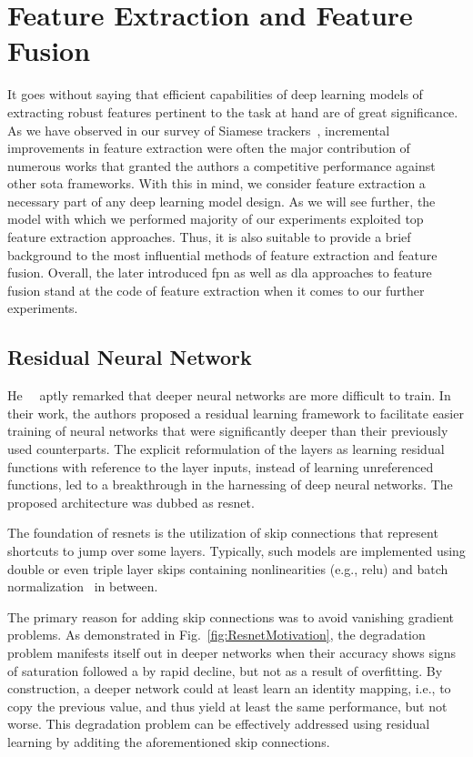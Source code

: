 \section{Feature Extraction and Feature Fusion}
\label{sec:FeatureExtractionFusion}

It goes without saying that efficient capabilities of deep learning models of extracting robust features pertinent to the task at hand are of great significance. As we have observed in our survey of Siamese trackers~\cite{ondrasovic2021siamese}, incremental improvements in feature extraction were often the major contribution of numerous works that granted the authors a competitive performance against other \gls{sota} frameworks. With this in mind, we consider feature extraction a necessary part of any deep learning model design. As we will see further, the model with which we performed majority of our experiments exploited top feature extraction approaches. Thus, it is also suitable to provide a brief background to the most influential methods of feature extraction and feature fusion. Overall, the later introduced \gls{fpn} as well as \gls{dla} approaches to feature fusion stand at the code of feature extraction when it comes to our further experiments.

\subsection{Residual Neural Network}
\label{ssec:ResidualNeuralNet}

He~\etal{}~\cite{he2015resnet} aptly remarked that deeper neural networks are more difficult to train. In their work, the authors proposed a residual learning framework to facilitate easier training of neural networks that were significantly deeper than their previously used counterparts. The explicit reformulation of the layers as learning residual functions with reference to the layer inputs, instead of learning unreferenced functions, led to a breakthrough in the harnessing of deep neural networks. The proposed architecture was dubbed as \gls{resnet}.

The foundation of \glspl{resnet} is the utilization of skip connections that represent shortcuts to jump over some layers. Typically, such models are implemented using double or even triple layer skips containing nonlinearities (e.g., \gls{relu}) and batch normalization~\cite{ioffe2015batchnorm} in between.

The primary reason for adding skip connections was to avoid vanishing gradient problems. As demonstrated in Fig.~\ref{fig:ResnetMotivation}, the degradation problem manifests itself out in deeper networks when their accuracy shows signs of saturation followed a by rapid decline, but not as a result of overfitting. By construction, a deeper network could at least learn an identity mapping, i.e., to copy the previous value, and thus yield at least the same performance, but not worse. This degradation problem can be effectively addressed using residual learning by additing the aforementioned skip connections.

